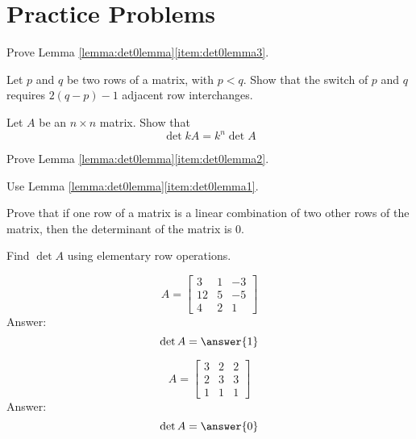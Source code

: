 \documentclass{ximera}
\begin{document}
\section*{Practice Problems}

\begin{problem}
Prove Lemma \ref{lemma:det0lemma}\ref{item:det0lemma3}.
\end{problem}

\begin{problem}
Let $p$ and $q$ be two rows of a matrix, with $p<q$.  Show that the switch of $p$ and $q$ requires $2(q-p)-1$ adjacent row interchanges.
\end{problem}

\begin{problem}Let $A$ be an $n\times n$ matrix.  Show that 
$$\det{kA}=k^n\det{A}$$
\end{problem}

\begin{problem}
Prove Lemma \ref{lemma:det0lemma}\ref{item:det0lemma2}.
\begin{hint}Use Lemma \ref{lemma:det0lemma}\ref{item:det0lemma1}.
\end{hint}
\end{problem}

\begin{problem}
Prove that if one row of a matrix is a linear combination of two other rows of the matrix, then the determinant of the matrix is 0.
\end{problem}

\begin{problem}
Find $\det{A}$ using elementary row operations.

\begin{problem}
$$A=\begin{bmatrix}3&1&-3\\12&5&-5\\4&2&1\end{bmatrix}$$
Answer:
$$\det{A}=\answer{1}$$
\end{problem}

\begin{problem}
$$A=\begin{bmatrix}3&2&2\\2&3&3\\1&1&1\end{bmatrix}$$
Answer:
$$\det{A}=\answer{0}$$
\end{problem}

\end{problem}
\end{document}
